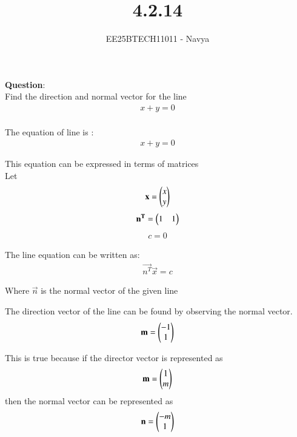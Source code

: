 \documentclass[journal]{IEEEtran}
\begin{document}

\vspace{3cm}

\title{4.2.14}
\author{EE25BTECH11011 - Navya}
\maketitle
{\let\newpage\relax\maketitle}

\renewcommand{\thefigure}{\theenumi}
\renewcommand{\thetable}{\theenumi}
\setlength{\intextsep}{10pt} %


\renewcommand{\thetable}{\theenumi}

\textbf{Question}:\\
Find the direction and normal vector for the line 
\begin{align}
x + y = 0
\end{align}
\solution \\

The equation of line is :
\begin{align}
x + y = 0
\end{align}

This equation can be expressed in terms of matrices\\
Let
\begin{align}
\mathbf{x} = \begin{pmatrix}x \\ y\end{pmatrix}
\end{align}
\begin{align}
\mathbf{n^T} = \begin{pmatrix}1 & 1\end{pmatrix}
\end{align}
\begin{align}
c = 0
\end{align}

The line equation can be written as:
\begin{align}
\vec{n^T}  \vec{x} = c
\end{align}

Where $\vec{n}$ is the normal vector of the given line

The direction vector of the line can be found by observing the normal vector.
\begin{align}
\mathbf{m} = \begin{pmatrix}-1 \\ 1\end{pmatrix}
\end{align}


This is true because if the director vector is represented as 
\begin{align}
\mathbf{m}  = \begin{pmatrix}1 \\ m\end{pmatrix}    
\end{align}
then the normal vector can be represented as 
\begin{align}
\mathbf{n} = \begin{pmatrix}-m \\ 1\end{pmatrix}
\end{align}
\end{document}
